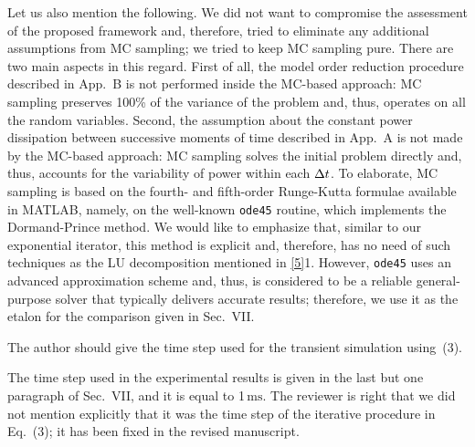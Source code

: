 \begin{authors}
Let us also mention the following.
We did not want to compromise the assessment of the proposed framework and, therefore, tried to eliminate any additional assumptions from MC sampling; we tried to keep MC sampling pure.
There are two main aspects in this regard.
First of all, the model order reduction procedure described in App.~B is not performed inside the MC-based approach: MC sampling preserves 100\% of the variance of the problem and, thus, operates on all the random variables.
Second, the assumption about the constant power dissipation between successive moments of time described in App.~A is not made by the MC-based approach: MC sampling solves the initial problem directly and, thus, accounts for the variability of power within each $\Delta t$.
To elaborate, MC sampling is based on the fourth- and fifth-order Runge-Kutta formulae available in MATLAB, namely, on the well-known \texttt{ode45} routine, which implements the Dormand-Prince method.
We would like to emphasize that, similar to our exponential iterator, this method is explicit and, therefore, has no need of such techniques as the LU decomposition mentioned in \cref{5}{1}.
However, \texttt{ode45} uses an advanced approximation scheme and, thus, is considered to be a reliable general-purpose solver that typically delivers accurate results; therefore, we use it as the etalon for the comparison given in Sec.~VII.

\begin{actions}
\end{actions}
\end{authors}

\begin{reviewer}
The author should give the time step used for the transient simulation using~(3).
\end{reviewer}
\begin{authors}
The time step used in the experimental results is given in the last but one paragraph of Sec.~VII, and it is equal to 1$\,\text{ms}$.
The reviewer is right that we did not mention explicitly that it was the time step of the iterative procedure in Eq.~(3); it has been fixed in the revised manuscript.

\begin{actions}
\end{actions}
\end{authors}

